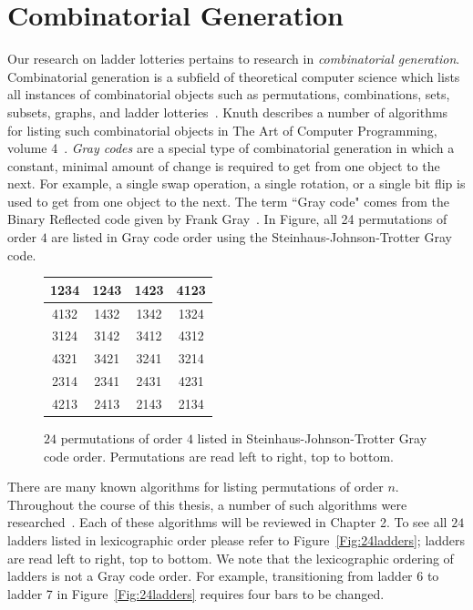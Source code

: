 \section{Combinatorial Generation}
Our research on ladder lotteries pertains to research in \emph{combinatorial generation}. Combinatorial 
generation is a subfield of theoretical computer science which lists all instances of  
combinatorial objects such as permutations, combinations, sets, subsets, graphs, and ladder lotteries~\cite{A42}. Knuth describes a number 
of algorithms for listing such combinatorial objects in The Art of Computer Programming, volume 4~\cite{A37}. \emph{Gray codes} are a 
special type of combinatorial generation in which a constant, minimal amount of change 
is required to get from one object to the next. For example, a single swap operation,
a single rotation, or a single bit flip is used to get from one object to the next. The term
``Gray code" comes from the Binary Reflected code given by Frank Gray~\cite{A39}. 
In Figure, all 24 permutations of order $4$ are listed in Gray code order using the Steinhaus-Johnson-Trotter Gray code.\par
\begin{figure}[ht]
	\centering
	\begin{tabular}{|c|c|c|c|}
		\hline
		1234 & 1243 & 1423 & 4123\\
		\hline
		4132 & 1432 & 1342 & 1324\\
		\hline
		3124 & 3142 & 3412 & 4312\\ 
		\hline
		4321 & 3421 & 3241 & 3214 \\
		\hline
		2314 & 2341 & 2431 & 4231 \\ 
		\hline 
		4213 & 2413 & 2143 & 2134 \\ 
		\hline
	\end{tabular}
	\caption{$24$ permutations of order $4$ listed in Steinhaus-Johnson-Trotter Gray code order. Permutations are read 
	left to right, top to bottom.}
\end{figure} 
There are many known algorithms for listing permutations of order $n$. Throughout the course of this thesis,
a number of such algorithms were researched~\cite{A18,A19,A21,A24,A25,A26,A31,A34,A35,A36,A37}.
Each of these algorithms will be reviewed in Chapter 2. 
To see all $24$ ladders listed in lexicographic order please refer to Figure~\ref{Fig:24ladders}; ladders are read left to right, top to bottom. 
We note that the lexicographic ordering of ladders is not a Gray code order. For example, transitioning from ladder 6 to ladder 7 in Figure~\ref{Fig:24ladders} 
requires four bars to be changed.\cleardoublepage


